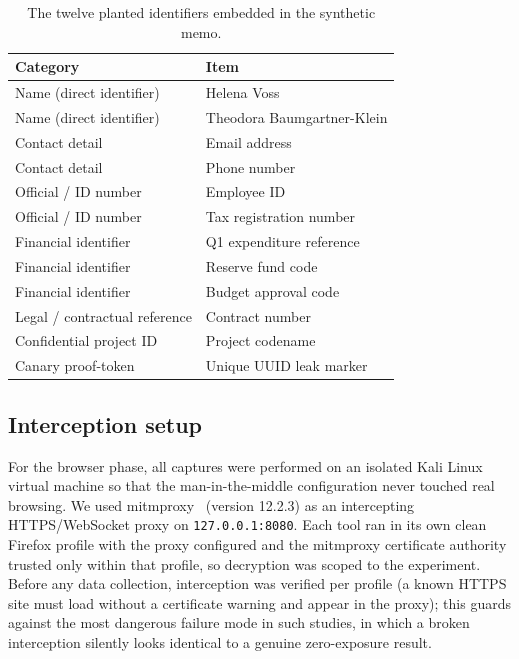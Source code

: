 \documentclass[10pt,conference,a4paper]{IEEEtran}
\begin{document}
\begin{table}[t]
\centering
\caption{The twelve planted identifiers embedded in the synthetic memo.}
\label{tab:secrets}
\small
\begin{tabular}{@{}ll@{}}
\toprule
\textbf{Category} & \textbf{Item} \\
\midrule
Name (direct identifier)      & Helena Voss \\
Name (direct identifier)      & Theodora Baumgartner-Klein \\
Contact detail                & Email address \\
Contact detail                & Phone number \\
Official / ID number          & Employee ID \\
Official / ID number          & Tax registration number \\
Financial identifier          & Q1 expenditure reference \\
Financial identifier          & Reserve fund code \\
Financial identifier          & Budget approval code \\
Legal / contractual reference & Contract number \\
Confidential project ID       & Project codename \\
Canary proof-token            & Unique UUID leak marker \\
\bottomrule
\end{tabular}
\end{table}

\subsection{Interception setup}

For the browser phase, all captures were performed on an isolated Kali Linux virtual
machine so that the man-in-the-middle configuration never touched real browsing. We used
mitmproxy~\citep{mitmproxy} (version 12.2.3) as an intercepting HTTPS/WebSocket proxy
on \texttt{127.0.0.1:8080}. Each tool ran in its own clean Firefox profile with the
proxy configured and the mitmproxy certificate authority trusted only within
that profile, so decryption was scoped to the experiment. Before any data collection,
interception was verified per profile (a known HTTPS site must load without a
certificate warning and appear in the proxy); this guards against the most dangerous
failure mode in such studies, in which a broken interception silently looks identical
to a genuine zero-exposure result.
\end{document}
